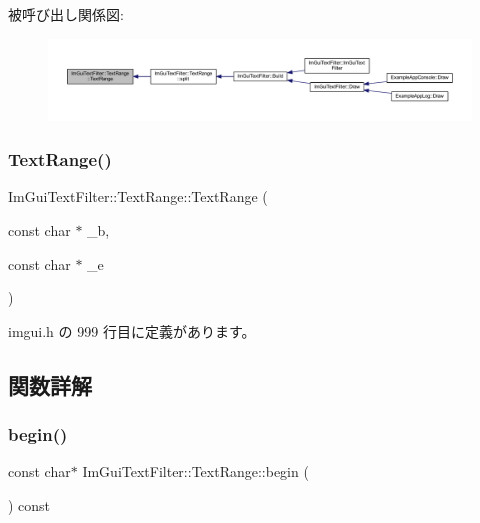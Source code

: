 被呼び出し関係図\+:\nopagebreak
\begin{figure}[H]
\begin{center}
\leavevmode
\includegraphics[width=350pt]{struct_im_gui_text_filter_1_1_text_range_a5a6548fd40884ef5837e6a1ffa33af61_icgraph}
\end{center}
\end{figure}
\mbox{\label{struct_im_gui_text_filter_1_1_text_range_a4a2b377d4fd141fc3664378041f9f007}} 
\subsubsection{\texorpdfstring{Text\+Range()}{TextRange()}\hspace{0.1cm}{\footnotesize\ttfamily [2/2]}}
{\footnotesize\ttfamily Im\+Gui\+Text\+Filter\+::\+Text\+Range\+::\+Text\+Range (\begin{DoxyParamCaption}\item[{const char $\ast$}]{\+\_\+b,  }\item[{const char $\ast$}]{\+\_\+e }\end{DoxyParamCaption})\hspace{0.3cm}{\ttfamily [inline]}}



 imgui.\+h の 999 行目に定義があります。



\subsection{関数詳解}
\mbox{\label{struct_im_gui_text_filter_1_1_text_range_ab6b04c316f081e8ad7b044a8afbda63c}} 
\subsubsection{\texorpdfstring{begin()}{begin()}}
{\footnotesize\ttfamily const char$\ast$ Im\+Gui\+Text\+Filter\+::\+Text\+Range\+::begin (\begin{DoxyParamCaption}{ }\end{DoxyParamCaption}) const\hspace{0.3cm}{\ttfamily [inline]}}



